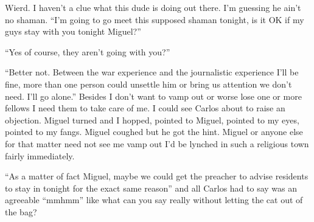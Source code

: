 Wierd. I haven't a clue what this dude is doing out there. I'm guessing he ain't no shaman. ``I'm going to go meet this supposed shaman tonight, is it OK if my guys stay with you tonight Miguel?'' 

``Yes of course, they aren't going with you?'' 

``Better not. Between the war experience and the journalistic experience I'll be fine, more than one person could unsettle him or bring us attention we don't need. I'll go alone.'' Besides I don't want to vamp out or worse lose one or more fellows I need them to take care of me. I could see Carlos about to raise an objection. Miguel turned and I hopped, pointed to Miguel, pointed to my eyes, pointed to my fangs. Miguel coughed but he got the hint. Miguel or anyone else for that matter need not see me vamp out I'd be lynched in such a religious town fairly immediately.

``As a matter of fact Miguel, maybe we could get the preacher to advise residents to stay in tonight for the exact same reason'' and all Carlos had to say was an agreeable ``mmhmm'' like what can you say really without letting the cat out of the bag? 

